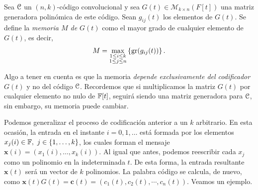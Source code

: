 \begin{definicion}
Sea $\mathcal C$ un $(n,k)$-código convolucional y sea $G(t) \in \mathcal{M}_{k \times n}(F[t])$ una matriz generadora polinómica de este código. Sean $g_{ij}(t)$ los elementos de $G(t)$. Se define la \emph{memoria $M$ de $G(t)$} como el mayor grado de cualquier elemento de $G(t)$, es decir,
$$ M = \max_{\substack{1 \leq i \leq k \\ 1 \leq j \leq n}} \left\{ \operatorname{gr}(g_{ij}(t)) \right\}.$$
\end{definicion}

Algo a tener en cuenta es que la memoria \emph{depende exclusivamente del codificador} $G(t)$ y no del código $\mathcal C$. Recordemos que si multiplicamos la matriz $G(t)$ por cualquier elemento no nulo de $\mathbb{F}[t]$, seguirá siendo una matriz generadora para $\mathcal C$, sin embargo, su memoria puede cambiar.

Podemos generalizar el proceso de codificación anterior a un $k$ arbitrario. En esta ocasión, la entrada en el instante $i = 0,1,\dots$ está formada por los elementos $x_j(i) \in \mathbb{F}, \ j \in \{1,\dots,k\}$, los cuales forman el mensaje $\mathbf{x}(i) = (x_1(i),\dots,x_k(i))$. Al igual que antes, podemos reescribir cada $x_j$ como un polinomio en la indeterminada $t$. De esta forma, la entrada resultante $\textbf{x}(t)$ será un vector de $k$ polinomios. La palabra código se calcula, de nuevo, como $\mathbf{x}(t)G(t) = \mathbf{c}(t) = (c_1(t),c_2(t),\cdots,c_n(t))$. Veamos un ejemplo.

